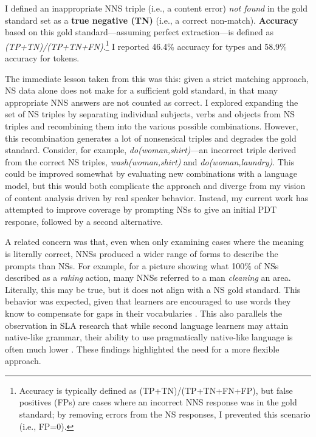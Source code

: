 I defined an inappropriate NNS triple (i.e., a content error)
\textit{not found} in the gold standard set as a \textbf{true negative
  (TN)} (i.e., a correct non-match). \textbf{Accuracy} based on this
gold standard---assuming perfect extraction---is defined as
\textit{(TP+TN)/(TP+TN+FN)}.\footnote{Accuracy is typically defined as (TP+TN)/(TP+TN+FN+FP), but false positives (FPs) are cases where an incorrect NNS response was in the gold standard; by removing errors from the NS responses, I prevented this scenario (i.e., FP=0).} I reported 46.4\% accuracy for types and 58.9\% accuracy for tokens.

The immediate lesson taken from this was this: given a strict matching approach, NS data alone does not make for a sufficient gold standard, in that many appropriate NNS answers are not counted as correct. I explored expanding the set of NS triples by separating individual subjects, verbs and objects from NS triples and recombining them into the various possible combinations. However, this recombination generates a lot of nonsensical triples and degrades the gold standard. Consider, for example, \textit{do(woman,shirt)}---an incorrect triple derived from the correct NS triples, \textit{wash(woman,shirt)} and \textit{do(woman,laundry)}. This could be improved somewhat by evaluating new combinations with a language model, but this would both complicate the approach and diverge from my vision of content analysis driven by real speaker behavior. Instead, my current work has attempted to improve coverage by prompting NSs to give an initial PDT response, followed by a second alternative.

A related concern was that, even when only examining cases
where the meaning is literally correct, NNSs produced a wider range of
forms to describe the prompts than NSs. For example, for a picture
showing what 100\% of NSs described as a \textit{raking} action,
many NNSs referred to a man \textit{cleaning} an area. Literally,
this may be true, but it does not align with a NS gold standard. 
This behavior was expected, given that learners are encouraged
to use words they know to compensate for gaps in their vocabularies
\citep{AgustinLlach2010}. This also parallels the observation in SLA research that while second language learners may attain native-like grammar, their ability to use
pragmatically native-like language is often much lower
\citep{BardoviDornyei1998}. These findings highlighted the need for a more flexible approach.

